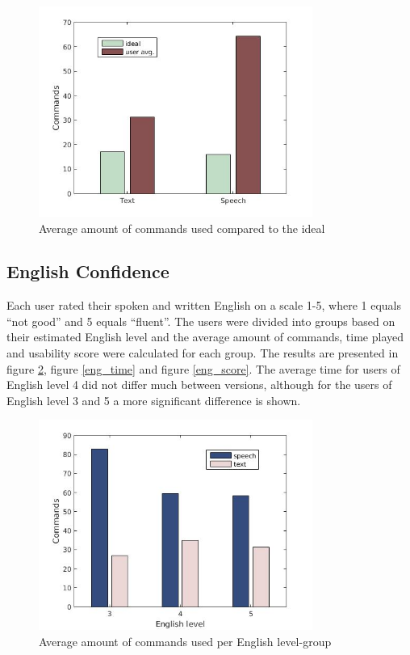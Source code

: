 \begin{figure}[ht]
  \centering
  \includegraphics[width=0.8\textwidth]{images/ideal_cmd.jpg}
  \caption{Average amount of commands used compared to the ideal}\label{ideal_cmd}
\end{figure}

\subsection{English Confidence} \label{sec:eng_con}
Each user rated their spoken and written English on a scale 1-5, where 1 equals ``not good'' and 5 equals ``fluent''. The users were divided into groups based on their estimated English level and the average amount of commands, time played and usability score were calculated for each group. The results are presented in figure \ref{eng_cmd}, figure \ref{eng_time} and figure \ref{eng_score}. The average time for users of English level 4 did not differ much between versions, although for the users of English level 3 and 5 a more significant difference is shown.
\newpage
\begin{figure}[ht]
  \centering
  \includegraphics[width=0.8\textwidth]{images/english_cmd.jpg}
  \caption{Average amount of commands used per English level-group}\label{eng_cmd}
\end{figure}

